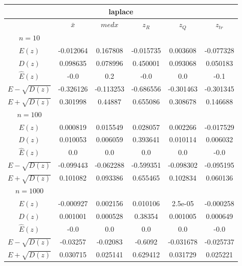 \begin{tabular}{|c | c | c | c | c | c|} 
 \hline \multicolumn{6}{|c|}{laplace} \\ 
 \hline & $\bar{x}$ & $medx$ & $z_R$ & $z_Q$ & $z_{tr}$ 
 \\ \hline $n=10$ & & & & & \\ 
 \hline $E(z)$ 
 &-0.012064 &0.167808 &-0.015735 &0.003608 &-0.077328 \\ 
 \hline $D(z)$ 
 &0.098635 &0.078996 &0.450001 &0.093068 &0.050183 \\ 
\hline $\hat{E}(z)$ 
&-0.0&0.2&-0.0&0.0&-0.1 \\ 
\hline $E-\sqrt{D(z)}$ 
&-0.326126&-0.113253&-0.686556&-0.301463&-0.301345 \\ 
\hline $E+\sqrt{D(z)}$ 
&0.301998&0.44887&0.655086&0.308678&0.146688 \\ \hline $n=100$ & & & & & \\ 
 \hline $E(z)$ 
 &0.000819 &0.015549 &0.028057 &0.002266 &-0.017529 \\ 
 \hline $D(z)$ 
 &0.010053 &0.006059 &0.393641 &0.010114 &0.006032 \\ 
\hline $\hat{E}(z)$ 
&0.0&0.0&0.0&0.0&-0.0 \\ 
\hline $E-\sqrt{D(z)}$ 
&-0.099443&-0.062288&-0.599351&-0.098302&-0.095195 \\ 
\hline $E+\sqrt{D(z)}$ 
&0.101082&0.093386&0.655465&0.102834&0.060136 \\ \hline $n=1000$ & & & & & \\ 
 \hline $E(z)$ 
 &-0.000927 &0.002156 &0.010106 &2.5e-05 &-0.000258 \\ 
 \hline $D(z)$ 
 &0.001001 &0.000528 &0.38354 &0.001005 &0.000649 \\ 
\hline $\hat{E}(z)$ 
&-0.0&0.0&0.0&0.0&-0.0 \\ 
\hline $E-\sqrt{D(z)}$ 
&-0.03257&-0.02083&-0.6092&-0.031678&-0.025737 \\ 
\hline $E+\sqrt{D(z)}$ 
&0.030715&0.025141&0.629412&0.031729&0.025221 \\ \hline 
 \end{tabular}